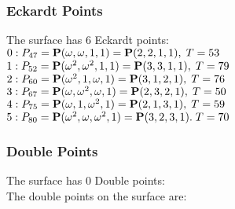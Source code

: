 \documentclass{article}
\newcommand{\bP}{{\bf P}}
\begin{document}
{\subsubsection*{Eckardt Points}
The surface has 6 Eckardt points:\\
$0 : P_{47}=\bP(\omega , \omega , 1, 1) = \bP(2, 2, 1, 1),\; T= 53$\\
$1 : P_{52}=\bP(\omega^{2}, \omega^{2}, 1, 1) = \bP(3, 3, 1, 1),\; T= 79$\\
$2 : P_{60}=\bP(\omega^{2}, 1, \omega , 1) = \bP(3, 1, 2, 1),\; T= 76$\\
$3 : P_{67}=\bP(\omega , \omega^{2}, \omega , 1) = \bP(2, 3, 2, 1),\; T= 50$\\
$4 : P_{75}=\bP(\omega , 1, \omega^{2}, 1) = \bP(2, 1, 3, 1),\; T= 59$\\
$5 : P_{80}=\bP(\omega^{2}, \omega , \omega^{2}, 1) = \bP(3, 2, 3, 1).\; T= 70$\\
\subsubsection*{Double Points}
The surface has 0 Double points:\\
The double points on the surface are:\\
\begin{multicols}{2}
\noindent
\end{multicols}
}
\end{document}
